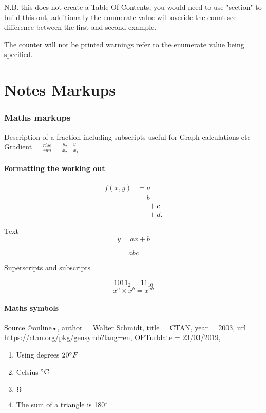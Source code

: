 \documentclass[fleqn]{report}
\begin{document}
N.B. this does not create a Table Of Contents, you would need to use "section" to build this out, additionally the enumerate value will overide the count see difference between the first and second example. \vspace{\baselineskip}

The counter will not be printed warnings refer to the enumerate value being specified.
\clearpage

\chapter{Notes Markups}

\subsection{Maths markups}
Description of a fraction including subscripts useful for Graph calculations etc
Gradient = {\Large $\frac{rise}{run} = \frac{y_2-y_1}{x_2-x_1}$}

\subsubsection{Formatting the working out}
\begin{equation}
\begin{split}
	f(x,y) & =a\\
       & = b \\[1ex]
       &\phantom{=}\, +c \\[2ex]
       &\phantom{=}\, +d.
\end{split}
\end{equation}

\noindent Text %
\begin{equation*} 
	y = ax + b
\end{equation*}

$$ abc $$

Superscripts and subscripts

$$1011_{2} = 11_{10}$$
$$x^a \times x^b = x^{ab}$$

\subsubsection{Maths symbols}
Source @online{•,
author = {Wal­ter Sch­midt},
title = {CTAN},
year = {2003},
url = {https://ctan.org/pkg/gensymb?lang=en},
OPTurldate = {23/03/2019},
}


\begin{enumerate}
	\item Using degrees $20 \degree F$
	\item Celsius $ \celsius $
	\item $\ohm$
	\item The sum of a triangle is 180$^{\circ}$
\end{enumerate}
\end{document}

